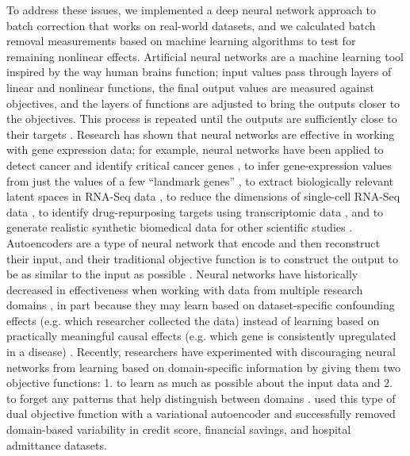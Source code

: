 \documentclass[12pt]{article}
\begin{document}
To address these issues, we implemented a deep neural network approach to batch correction that works on real-world datasets, and we calculated batch removal measurements based on machine learning algorithms to test for remaining nonlinear effects.
Artificial neural networks are a machine learning tool inspired by the way human brains function; input values pass through layers of linear and nonlinear functions, the final output values are measured against objectives, and the layers of functions are adjusted to bring the outputs closer to the objectives.
This process is repeated until the outputs are sufficiently close to their targets \citep{schmidhuber_deep_2015}.
Research has shown that neural networks are effective in working with gene expression data; for example, neural networks have been applied
to detect cancer and identify critical cancer genes \citep{danaee_deep_2016},
to infer gene-expression values from just the values of a few ``landmark genes'' \citep{chen_gene_2016},
to extract biologically relevant latent spaces in RNA-Seq data \citep{way_extracting_2017},
to reduce the dimensions of single-cell RNA-Seq data \citep{lin_using_2017},
to identify drug-repurposing targets using transcriptomic data \citep{aliper_deep_2016},
and to generate realistic synthetic biomedical data for other scientific studies \citep{beaulieu-jones_privacy-preserving_2017}.
Autoencoders are a type of neural network that encode and then reconstruct their input, and their traditional objective function is to construct the output to be as similar to the input as possible \citep{hinton_reducing_2006}.
Neural networks have historically decreased in effectiveness when working with data from multiple research domains \citep{ganin_domain-adversarial_2015}, in part because they may learn based on dataset-specific confounding effects (e.g. which researcher collected the data) instead of learning based on practically meaningful causal effects (e.g. which gene is consistently upregulated in a disease) \citep{louizos_causal_2017-2}.
Recently, researchers have experimented with discouraging neural networks from learning based on domain-specific information by giving them two objective functions:
1. to learn as much as possible about the input data and
2. to forget any patterns that help distinguish between domains \citep{ganin_domain-adversarial_2015,tzeng_deep_2014-2}.
\citet{louizos_variational_2015} used this type of dual objective function with a variational autoencoder and successfully removed domain-based variability in credit score, financial savings, and hospital admittance datasets.
\end{document}
